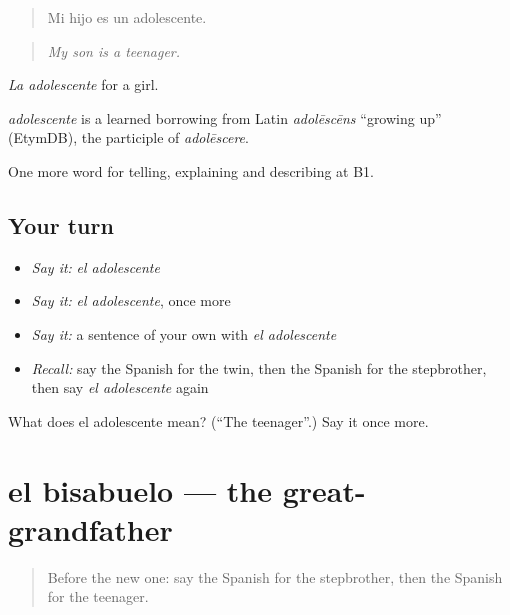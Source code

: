 \begin{quote}
Mi hijo es un adolescente.
\end{quote}

\begin{quote}
\emph{My son is a teenager.}
\end{quote}

\emph{La adolescente} for a girl.

\begin{cousinweb}
\emph{adolescente} is a learned borrowing from Latin \emph{adolēscēns} \textquotedblleft{}growing up\textquotedblright{} (EtymDB), the participle of \emph{adolēscere}.
\end{cousinweb}

\begin{grammarlens}[title={What you've built}]
One more word for telling, explaining and describing at B1.
\end{grammarlens}

\subsection*{Your turn}
\begin{itemize}
\raggedright
  \item \emph{Say it:} \emph{el adolescente}
  \item \emph{Say it:} \emph{el adolescente}, once more
  \item \emph{Say it:} a sentence of your own with \emph{el adolescente}
  \item \emph{Recall:} say the Spanish for the twin, then the Spanish for the stepbrother, then say \emph{el adolescente} again
\end{itemize}

\begin{tcolorbox}[breakable,colback=teal!4,colframe=teal!35!black,title={Before you move on}]
What does el adolescente mean? (\textquotedblleft{}The teenager\textquotedblright{}.) Say it once more.
\end{tcolorbox}
\section[el bisabuelo]{el bisabuelo — the great-grandfather}

\label{lesson:ES-C749-bisabuelo}



\begin{quote}
Before the new one: say the Spanish for the stepbrother, then the Spanish for the teenager.
\end{quote}


